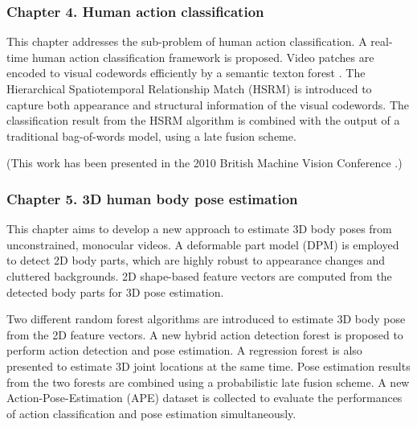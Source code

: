 \subsubsection*{Chapter 4. Human action classification} 

This chapter addresses the sub-problem of human action classification. A real-time human action classification framework is proposed. Video patches are encoded to visual codewords efficiently by a semantic texton forest \cite{Shotton2008}. The Hierarchical Spatiotemporal Relationship Match (HSRM) is introduced to capture both appearance and structural information of the visual codewords. The classification result from the HSRM algorithm is combined with the output of a traditional bag-of-words model, using a late fusion scheme.  

(This work has been presented in the 2010 British Machine Vision Conference \cite{Yu2010}.)  

\subsubsection*{Chapter 5. 3D human body pose estimation} 

This chapter aims to develop a new approach to estimate 3D body poses from unconstrained, monocular videos. 
A deformable part model (DPM) is employed to detect 2D body parts, which are highly robust to appearance changes and cluttered backgrounds. 2D shape-based feature vectors are computed from the detected body parts for 3D pose estimation. 

Two different random forest algorithms are introduced to estimate 3D body pose from the 2D feature vectors. 
A new hybrid action detection forest is proposed to perform action detection and pose estimation. A regression forest is also presented to estimate 3D joint locations at the same time. Pose estimation results from the two forests are combined using a probabilistic late fusion scheme. A new Action-Pose-Estimation (APE) dataset is collected to evaluate the performances of action classification and pose estimation simultaneously. 


